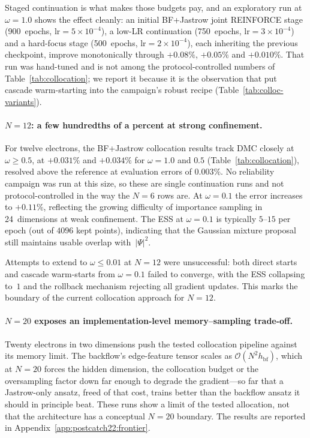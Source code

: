 Staged continuation is what makes those budgets pay, and an exploratory run at
$\omega{=}1.0$ shows the effect cleanly: an initial BF+Jastrow joint REINFORCE stage
(900~epochs, $\text{lr}{=}5{\times}10^{-4}$), a low-LR continuation (750~epochs,
$\text{lr}{=}3{\times}10^{-4}$) and a hard-focus stage (500~epochs,
$\text{lr}{=}2{\times}10^{-4}$), each inheriting the previous checkpoint, improve
monotonically through $+0.08\%$, $+0.05\%$ and $+0.010\%$. That run was hand-tuned and is
not among the protocol-controlled numbers of Table~\ref{tab:collocation}; we report it
because it is the observation that put cascade warm-starting into the campaign's robust
recipe (Table~\ref{tab:colloc-variants}).

\paragraph{$N{=}12$: a few hundredths of a percent at strong confinement.}
For twelve electrons, the BF+Jastrow collocation results track DMC
closely at $\omega\ge 0.5$, at $+0.031\%$ and $+0.034\%$ for $\omega{=}1.0$ and $0.5$
(Table~\ref{tab:collocation}), resolved above the reference at evaluation errors of
$0.003\%$. No reliability campaign was run at this size, so these are single continuation
runs and not protocol-controlled in the way the $N{=}6$ rows are.
At $\omega{=}0.1$ the error increases to $+0.11\%$, reflecting the
growing difficulty of importance sampling in 24~dimensions at weak
confinement.
The ESS at $\omega{=}0.1$ is typically $5$--$15$ per epoch
(out of $4096$ kept points), indicating that the Gaussian mixture
proposal still maintains usable overlap with~$|\Psi|^2$.

Attempts to extend to $\omega\le 0.01$ at $N{=}12$ were
unsuccessful: both direct starts and cascade warm-starts from
$\omega{=}0.1$ failed to converge, with the ESS collapsing to~$1$
and the rollback mechanism rejecting all gradient updates.
This marks the boundary of the current collocation approach for
$N{=}12$.

\paragraph{$N{=}20$ exposes an implementation-level memory--sampling trade-off.}
Twenty electrons in two dimensions push the tested collocation pipeline against its memory
limit. The backflow's edge-feature tensor scales as
$\mathcal{O}(N^2 h_{\mathrm{bf}})$, which at $N{=}20$ forces the hidden dimension, the
collocation budget or the oversampling factor down far enough to degrade the gradient---so
far that a Jastrow-only ansatz, freed of that cost, trains better than the backflow ansatz it
should in principle beat. These runs show a limit of the tested allocation, not that the
architecture has a conceptual $N{=}20$ boundary. The results are reported in
Appendix~\ref{app:postcatch22:frontier}.

